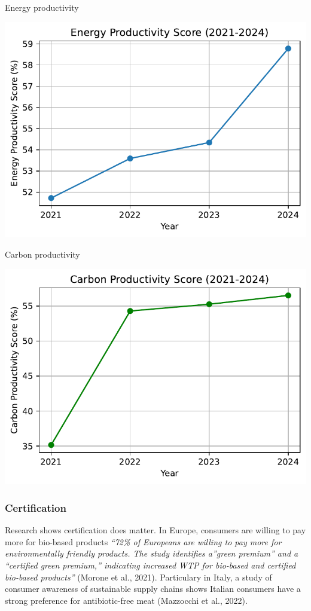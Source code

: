 \documentclass[
  letterpaper,
  DIV=11,
  numbers=noendperiod]{scrartcl}
\begin{document}
Energy productivity

\includegraphics{_thesis_files/figure-pdf/cell-51-output-1.pdf}

Carbon productivity

\includegraphics{_thesis_files/figure-pdf/cell-52-output-1.pdf}

\subsubsection{Certification}\label{certification}

Research shows certification does matter. In Europe, consumers are
willing to pay more for bio-based products \emph{``72\% of Europeans are
willing to pay more for environmentally friendly products. The study
identifies a''green premium'' and a ``certified green premium,''
indicating increased WTP for bio-based and certified bio-based
products''} (Morone et al., 2021). Particulary in Italy, a study of
consumer awareness of sustainable supply chains shows Italian consumers
have a strong preference for antibiotic-free meat (Mazzocchi et al.,
2022).
\end{document}
